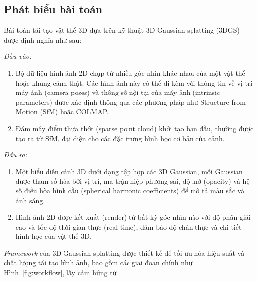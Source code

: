     \subsection{Phát biểu bài toán}
    Bài toán tái tạo vật thể 3D dựa trên kỹ thuật 3D Gaussian splatting (3DGS) được định nghĩa như sau: 
    
    \textit{Đầu vào:}
        \begin{enumerate}
            \item Bộ dữ liệu hình ảnh 2D chụp từ nhiều góc nhìn khác nhau của một vật thể hoặc khung cảnh thật. Các hình ảnh này có thể đi kèm với thông tin về vị trí máy ảnh (camera poses) và thông số nội tại của máy ảnh (intrinsic parameters) được xác định thông qua các phương pháp như Structure-from-Motion (SfM) hoặc COLMAP.
            \item Đám mây điểm thưa thớt (sparse point cloud) khởi tạo ban đầu, thường được tạo ra từ SfM, đại diện cho các đặc trưng hình học cơ bản của cảnh.
        \end{enumerate}
        
    \textit{Đầu ra:}
        \begin{enumerate}
            \item Một biểu diễn cảnh 3D dưới dạng tập hợp các 3D Gaussian, mỗi Gaussian được tham số hóa bởi vị trí, ma trận hiệp phương sai, độ mờ (opacity) và hệ số điều hòa hình cầu (spherical harmonic coefficients) để mô tả màu sắc và ánh sáng.
            \item Hình ảnh 2D được kết xuất (render) từ bất kỳ góc nhìn nào với độ phân giải cao và tốc độ thời gian thực (real-time), đảm bảo độ chân thực và chi tiết hình học của vật thể 3D. \\
        \end{enumerate} 
        
    \textit{Framework} của 3D Gaussian splatting được thiết kế để tối ưu hóa hiệu suất và chất lượng tái tạo hình ảnh, bao gồm các giai đoạn chính như Hình~\ref{fig:workflow}, lấy cảm hứng từ \cite{b1}
        
